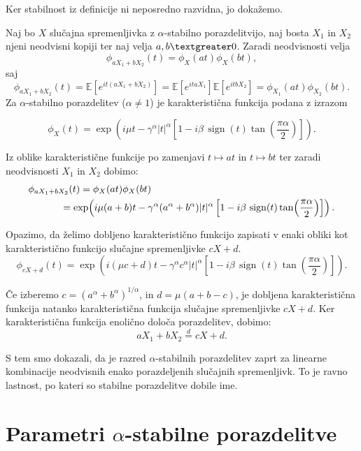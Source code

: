 \documentclass[a4paper, 12pt, openany]{book}
\begin{document}
Ker stabilnost iz definicije ni neposredno razvidna, jo dokažemo.
\begin{tcolorbox}[colback=red!5!white,colframe=red!50!black,title=Dokaz 1: Stabilnost $\alpha$-stabilne porazdelitve]
Naj bo $X$ slučajna spremenljivka z $\alpha$-stabilno porazdelitvijo, naj bosta $X_1$ in $X_2$ njeni neodvisni kopiji ter naj velja $a,b \textgreater 0$. Zaradi neodvisnosti velja
\[
\phi_{aX_1+bX_2}(t)
=
\phi_X(at)\phi_X(bt),
\]
saj
\[
\phi_{aX_1+bX_2}(t)
= \mathbb{E}\!\left[e^{it(aX_1+bX_2)}\right]
= \mathbb{E}\!\left[e^{itaX_1}\right]
  \mathbb{E}\!\left[e^{itbX_2}\right]
= \phi_{X_1}(at)\phi_{X_2}(bt).
\]
Za $\alpha$-stabilno porazdelitev ($\alpha\neq1$) je karakteristična funkcija podana z izrazom

\[
\phi_X(t)
=
\exp\!\left(
i\mu t
-\gamma^\alpha |t|^\alpha
\left[
1-i\beta\,\operatorname{sign}(t)\tan\!\left(\frac{\pi\alpha}{2}\right)
\right]
\right).
\]

Iz oblike karakteristične funkcije po zamenjavi $t\mapsto at$ in $t\mapsto bt$ ter zaradi neodvisnosti $X_1$ in $X_2$ dobimo:
\[
\begin{aligned}
\phi_{aX_1+bX_2}(t)
&=
\phi_X(at)\phi_X(bt) \\
&\hspace{-2em}=
\exp\!\left(
i\mu(a+b)t
-
\gamma^\alpha(a^\alpha+b^\alpha)|t|^\alpha
\left[
1-i\beta\,\operatorname{sign}(t)\tan\!\left(\frac{\pi\alpha}{2}\right)
\right]
\right).
\end{aligned}
\]


Opazimo, da želimo dobljeno karakteristično funkcijo zapisati v enaki obliki kot karakteristično funkcijo slučajne spremenljivke $cX+d$.
\[
\phi_{cX + d}(t)=
\exp\!\left(
i(\mu c + d)t 
-
\gamma^\alpha c^\alpha|t|^\alpha
\left[
1-i\beta\,\operatorname{sign}(t)\tan\!\left(\frac{\pi\alpha}{2}\right)
\right]
\right).
\]

Če izberemo $c=\left(a^\alpha+b^\alpha\right)^{1/\alpha}$, in $d=\mu(a+b-c)$, je dobljena karakteristična funkcija natanko karakteristična funkcija slučajne spremenljivke $cX+d$. Ker karakteristična funkcija enolično določa porazdelitev, dobimo:
\[
aX_1+bX_2 \overset{d}{=} cX+d.
\]
\end{tcolorbox}
S tem smo dokazali, da je razred $\alpha$-stabilnih porazdelitev zaprt za linearne kombinacije neodvisnih enako porazdeljenih slučajnih spremenljivk. To je ravno lastnost, po kateri so stabilne porazdelitve dobile ime.

\section{Parametri $\alpha$-stabilne porazdelitve}
\end{document}
